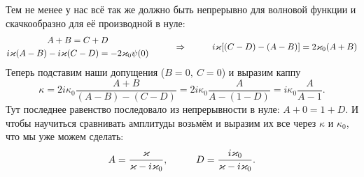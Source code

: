 Тем не менее у нас всё так же должно быть непрерывно для волновой функции и скачкообразно для её производной в нуле:
\begin{equation*}
	\begin{gathered}
		A + B = C + D\\
		i \kappa (A - B) - i \kappa (C - D) = - 2 \kappa_0 \psi(0)
	\end{gathered}
	\hspace{1 cm}
	\Rightarrow
	\hspace{1 cm}
	i \kappa [(C - D) - (A - B)] = 2 \kappa_0 (A + B)
\end{equation*}
Теперь подставим наши допущения ($B = 0, \ C = 0$) и выразим каппу
\begin{equation*}
	\kappa = 2 i \kappa_0 \frac{A + B}{(A - B) - (C - D)} = 2 i \kappa_0 \frac{A}{A - (1 - D)}
	= i \kappa_0 \frac{A}{A - 1}.
\end{equation*}
Тут последнее равенство последовало из непрерывности в нуле: $A + 0 = 1 + D$. И чтобы научиться сравнивать амплитуды возьмём и выразим их все через $\kappa$ и $\kappa_0$, что мы уже можем сделать:
\begin{equation*}
	A = \frac{\kappa}{\kappa - i \kappa_0},
	\hspace{1 cm}
	D = \frac{i \kappa_0}{\kappa - i \kappa_0}.
\end{equation*}


